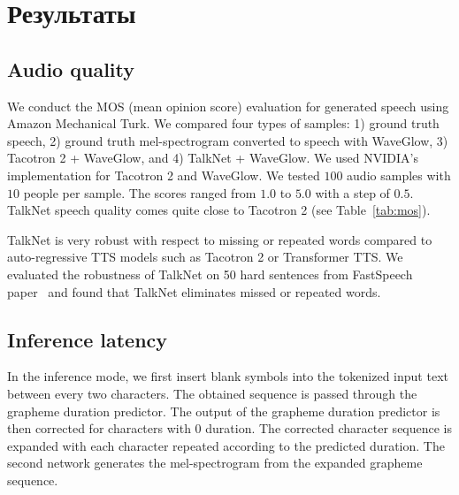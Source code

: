 \section{Результаты}

\subsection{Audio quality}

We conduct the MOS (mean opinion score) evaluation for generated speech using Amazon Mechanical Turk. We compared four types of samples: 1) ground truth speech, 2) ground truth mel-spectrogram converted to speech with WaveGlow, 3) Tacotron 2 + WaveGlow, and 4) TalkNet + WaveGlow. We used NVIDIA's implementation for Tacotron 2 and WaveGlow. We tested $100$ audio samples with $10$ people per sample. The scores ranged from $1.0$ to $5.0$ with a step of $0.5$. TalkNet speech quality comes quite close to Tacotron 2 (see Table~\ref{tab:mos}). 

\begin{table}[!ht]
\centering
{}
\caption{MOS scores with $95\%$ confidence interval}
\label{tab:mos}
\end{table}

TalkNet is very robust with respect to missing or repeated words compared to auto-regressive TTS models such as Tacotron 2 or Transformer TTS. We evaluated the robust\-ness of TalkNet on 50 hard sentences from FastSpeech paper~\cite{fastspeech} and found that TalkNet eliminates missed or repeated words.

\subsection{Inference latency}

In the inference mode, we first insert blank symbols into the tokenized input text between every two characters. The obtained sequence is passed through the grapheme duration predictor. The output of the grapheme duration predictor is then corrected for characters with $0$ duration. The corrected character sequence is expanded with each character repeated according to the predicted duration. The second network generates the mel-spectrogram from the expanded grapheme sequence.

